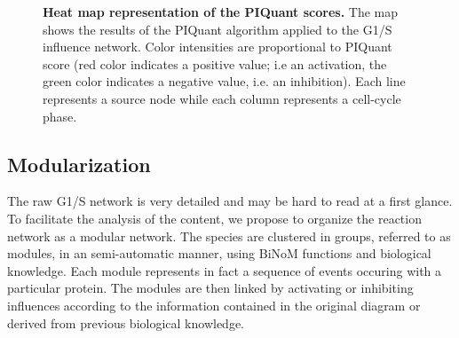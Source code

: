 \documentclass[10pt]{bmc_article}
\newenvironment{bmcformat}{\baselineskip20pt\sloppy\setboolean{publ}{false}}{\baselineskip20pt\sloppy}
\begin{document}
\begin{bmcformat}
\begin{figure}[h]
  \caption{\label{PIQuantHeatMap} \textbf{Heat map representation of the PIQuant
scores.}
    The map shows the results of the PIQuant algorithm applied to the G1/S
influence network. Color intensities are proportional to PIQuant score (red color indicates a positive
value; i.e an activation, the green color indicates a negative value, i.e. an
inhibition).
Each line represents a source node while each column represents a cell-cycle
phase.}
 
\end{figure}



\subsection*{Modularization} 

The raw G1/S network is very detailed and may be hard to read at a first glance.
To facilitate the analysis of the content, we propose to organize the reaction
network as a modular network. The species are clustered in groups, referred to
as modules, in an semi-automatic manner, using BiNoM functions and biological
knowledge. Each module represents in fact a
sequence of events occuring with a particular protein. The modules are then
linked by activating or inhibiting influences according to the information
contained in the original diagram or derived from previous biological knowledge.


\end{bmcformat}
\end{document}
